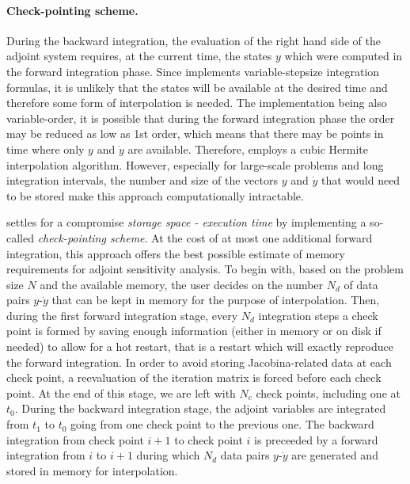 \paragraph{Check-pointing scheme.}
During the backward integration, the evaluation of the right hand side 
of the adjoint system requires, at the current time, the states $y$ which
were computed in the forward integration phase.
Since {\cvodes} implements variable-stepsize integration formulas,
it is unlikely that the states will be available at the desired time and
therefore some form of interpolation is needed. The {\cvodes} implementation
being also variable-order, it is possible that during the forward
integration phase the order may be reduced as low as 1st order,
which means that there may be points in time where only $y$ and ${\dot y}$
are available. Therefore, {\cvodes} employs a cubic Hermite interpolation
algorithm. However, especially for large-scale problems and long integration
intervals, the number and size of the vectors $y$ and ${\dot y}$ that would 
need to be stored make this approach computationally intractable. 

{\cvodes} settles for a compromise {\em storage space - execution time} by
implementing a so-called {\em check-pointing scheme}. At the cost of
at most one additional forward integration, this approach offers the best possible 
estimate of memory requirements for adjoint sensitivity analysis. To begin with,
based on the problem size $N$ and the available memory, the user decides on 
the number $N_d$ of data pairs $y$-${\dot y}$ that can be kept in memory for 
the purpose of interpolation. Then, during the first forward integration stage, 
every $N_d$ integration steps a check point is formed by saving enough information
(either in memory or on disk if needed) to allow for a hot restart, that is a restart
which will exactly reproduce the forward integration. In order to avoid storing
Jacobina-related data at each check point, a reevaluation of the iteration matrix
is forced before each check point. At the end of this stage, we are left with $N_c$ 
check points, including one at $t_0$.
During the backward integration stage, the adjoint variables are integrated
from $t_1$ to $t_0$ going from one check point to the previous one.
The backward integration from check point $i+1$ to check point $i$ is preceeded
by a forward integration from $i$ to $i+1$ during which $N_d$ data pairs 
$y$-${\dot y}$ are generated and stored in memory for interpolation.

